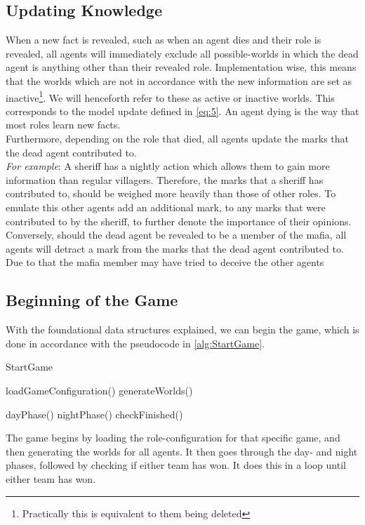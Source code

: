\subsection{Updating Knowledge}\label{sec:UpdatingKnowledge}
When a new fact is revealed, such as when an agent dies and their role is
revealed, all agents will immediately exclude all possible-worlds in which the
dead agent is anything other than their revealed role. Implementation wise,
this means that the worlds which are not in accordance with the new information
are set as inactive\footnote{Practically this is equivalent to them being
	deleted}. We will henceforth refer to these as active or inactive worlds. This
corresponds to the model update defined in \cref{eq:5}. An agent dying is the
way that most roles learn new facts. \\ Furthermore, depending on the role that
died, all agents update the marks that the dead agent contributed to.\\
\textit{For example}: A sheriff has a nightly action which allows them to gain
more information than regular villagers. Therefore, the marks that a sheriff
has contributed to, should be weighed more heavily than those of other roles.
To emulate this other agents add an additional mark, to any marks that were
contributed to by the sheriff, to further denote the importance of their
opinions. \\ Conversely, should the dead agent be revealed to be a member of
the mafia, all agents will detract a mark from the marks that the dead agent
contributed to. Due to that the mafia member may have tried to deceive the
other agents

\subsection{Beginning of the Game}\label{sec:beginningOfTheGame}
With the foundational data structures explained, we can begin the game, which
is done in accordance with the pseudocode in \cref{alg:StartGame}.
\begin{algorithm}[H]
	\caption{StartGame}
	\begin{algorithmic}[1]
		\State loadGameConfiguration()
		\State generateWorlds()

		\State dayPhase()
		\State nightPhase()
		\State checkFinished()
		\EndWhile
		\EndFunction
	\end{algorithmic}\label{alg:StartGame}
\end{algorithm}
\setcounter{algorithmcaption}{0}
The game begins by loading the role-configuration for that specific game, and
then generating the worlds for all agents. It then goes through the day- and
night phases, followed by checking if either team has won. It does this in a
loop until either team has won.

